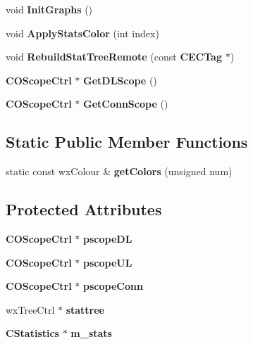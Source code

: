 \begin{DoxyCompactItemize}
\item 
void {\bfseries InitGraphs} ()\label{classCStatisticsDlg_aa9e1425a49d64cc7a4abd1e1a381d4ff}

\item 
void {\bfseries ApplyStatsColor} (int index)\label{classCStatisticsDlg_a0fe25919015a0bfa23172e189397a3ed}

\item 
void {\bfseries RebuildStatTreeRemote} (const {\bf CECTag} $\ast$)\label{classCStatisticsDlg_afab621fe3f9b552d4e75a67854ff3075}

\item 
{\bf COScopeCtrl} $\ast$ {\bfseries GetDLScope} ()\label{classCStatisticsDlg_a06c089cdcf883c5ddf0f4747f69769ff}

\item 
{\bf COScopeCtrl} $\ast$ {\bfseries GetConnScope} ()\label{classCStatisticsDlg_a7a065de743e3ba0af70a164b932734cf}

\end{DoxyCompactItemize}
\subsection*{Static Public Member Functions}
\begin{DoxyCompactItemize}
\item 
static const wxColour \& {\bfseries getColors} (unsigned num)\label{classCStatisticsDlg_a840c036884587b75b71916bc3fa5ff2e}

\end{DoxyCompactItemize}
\subsection*{Protected Attributes}
\begin{DoxyCompactItemize}
\item 
{\bf COScopeCtrl} $\ast$ {\bfseries pscopeDL}\label{classCStatisticsDlg_ab29c0ea464b7470aac1186642c7d9328}

\item 
{\bf COScopeCtrl} $\ast$ {\bfseries pscopeUL}\label{classCStatisticsDlg_afda689444bf79d260929f414e6464e69}

\item 
{\bf COScopeCtrl} $\ast$ {\bfseries pscopeConn}\label{classCStatisticsDlg_a54d9664f5d4a4607c776e38fd3e0310e}

\item 
wxTreeCtrl $\ast$ {\bfseries stattree}\label{classCStatisticsDlg_a5015f9cdb61ee545d299a6b80da15d08}

\item 
{\bf CStatistics} $\ast$ {\bfseries m\_\-stats}\label{classCStatisticsDlg_ac1876e7936d79e0a79dea74749d99735}

\end{DoxyCompactItemize}
